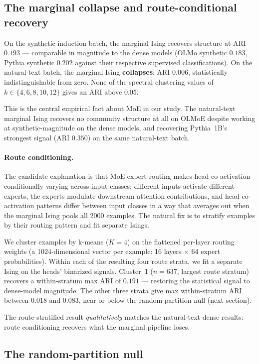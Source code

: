 \documentclass[11pt]{article}
\begin{document}
\subsection{The marginal collapse and route-conditional recovery}
On the synthetic induction batch, the marginal Ising recovers structure at
ARI $0.193$ --- comparable in magnitude to the dense models (OLMo
synthetic $0.183$, Pythia synthetic $0.202$ against their respective
supervised classifications). On the natural-text batch, the marginal Ising
\textbf{collapses}: ARI $0.006$, statistically indistinguishable from
zero. None of the spectral clustering values of
$k \in \{4, 6, 8, 10, 12\}$ gives an ARI above $0.05$.

This is the central empirical fact about MoE in our study. The
natural-text marginal Ising recovers no community structure at all on
OLMoE despite working at synthetic-magnitude on the dense models, and
recovering Pythia~1B's strongest signal (ARI $0.350$) on the same
natural-text batch.

\paragraph{Route conditioning.} The candidate explanation is that MoE
expert routing makes head co-activation conditionally varying across
input classes: different inputs activate different experts, the experts
modulate downstream attention contributions, and head co-activation
patterns differ between input classes in a way that averages out when
the marginal Ising pools all 2000 examples. The natural fix is to
stratify examples by their routing pattern and fit separate Isings.

We cluster examples by k-means ($K = 4$) on the flattened per-layer
routing weights (a 1024-dimensional vector per example: 16 layers $\times$
64 expert probabilities). Within each of the resulting four route strata,
we fit a separate Ising on the heads' binarized signals. Cluster~1 ($n =
637$, largest route stratum) recovers a within-stratum max ARI of
$\mathbf{0.191}$ --- restoring the statistical signal to dense-model
magnitude. The other three strata give max within-stratum ARI between
$0.018$ and $0.083$, near or below the random-partition null (next
section).

The route-stratified result \emph{qualitatively} matches the natural-text
dense results: route conditioning recovers what the marginal pipeline
loses.

\subsection{The random-partition null}
\label{sec:null-result}
\end{document}
